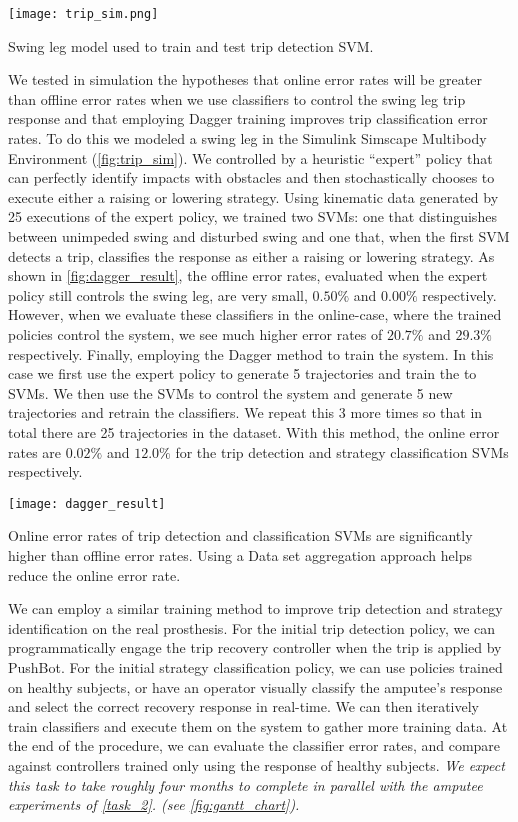 \begin{marginfigure}
    \centering
    \texttt{[image: trip\_sim.png]}
    \caption{Swing leg model used to train and test trip detection
    SVM.}\label{fig:trip_sim}
\end{marginfigure}
We tested in simulation the hypotheses that online error rates will be greater
than offline error rates when we use classifiers to control the swing leg trip
response and that employing Dagger training improves trip classification error
rates. To do this we modeled a swing leg in the Simulink Simscape Multibody
Environment (\cref{fig:trip_sim}). We controlled by a heuristic ``expert''
policy that can perfectly identify impacts with obstacles and then
stochastically chooses to execute either a raising or lowering strategy. Using
kinematic data generated by 25 executions of the expert policy, we trained two
SVMs: one that distinguishes between unimpeded swing and disturbed swing and one
that, when the first SVM detects a trip, classifies the response as either a
raising or lowering strategy. As shown in \cref{fig:dagger_result}, the offline
error rates, evaluated when the expert policy still controls the swing leg, are
very small, $0.50\%$ and $0.00\%$ respectively. However, when we evaluate these
classifiers in the online-case, where the trained policies control the system,
we see much higher error rates of $20.7\%$ and $29.3\%$ respectively. Finally,
employing the Dagger method to train the system. In this case we first use the
expert policy to generate 5 trajectories and train the to SVMs. We then use the
SVMs to control the system and generate 5 new trajectories and retrain the
classifiers.  We repeat this 3 more times so that in total there are 25
trajectories in the dataset. With this method, the online error rates are
$0.02\%$ and $12.0\%$ for the trip detection and strategy classification SVMs
respectively. 
\begin{marginfigure}[-1in]
    \centering
    \texttt{[image: dagger\_result]}
    \caption{Online error rates of trip detection and classification SVMs are
    significantly higher than offline error rates. Using a Data set aggregation
    approach helps reduce the online error rate.}\label{fig:dagger_result}
\end{marginfigure}

We can employ a similar training method to improve trip detection and strategy
identification on the real prosthesis. For the initial trip detection policy, we
can programmatically engage the trip recovery controller when the trip is
applied by PushBot. For the initial strategy classification policy, we can use
policies trained on healthy subjects, or have an operator visually classify the
amputee's response and select the correct recovery response in real-time. We can
then iteratively train classifiers and execute them on the system to gather more
training data. At the end of the procedure, we can evaluate the classifier error
rates, and compare against controllers trained only using the response of
healthy subjects. \emph{We expect this task to take roughly four months to
complete in parallel with the amputee experiments of \cref{task_2}.  (see
\cref{fig:gantt_chart}).}

